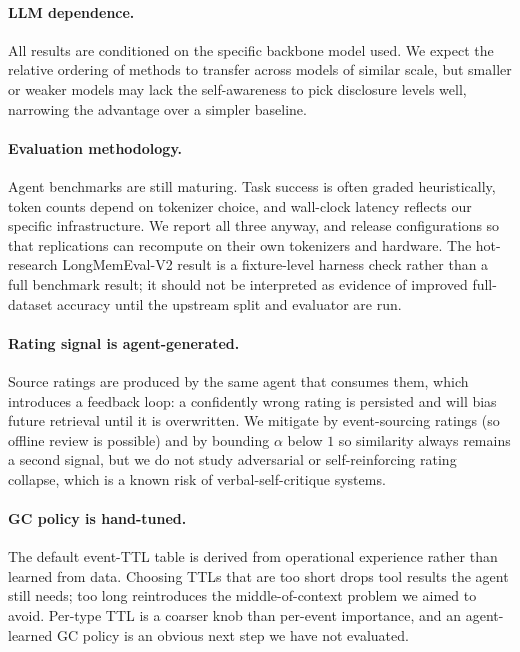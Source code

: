 \paragraph{LLM dependence.} All results are conditioned on the
specific backbone model used. We expect the relative ordering of
methods to transfer across models of similar scale, but smaller or
weaker models may lack the self-awareness to pick disclosure levels
well, narrowing the advantage over a simpler baseline.

\paragraph{Evaluation methodology.} Agent benchmarks are still
maturing. Task success is often graded heuristically, token counts
depend on tokenizer choice, and wall-clock latency reflects our
specific infrastructure. We report all three anyway, and release
configurations so that replications can recompute on their own
tokenizers and hardware. The hot-research LongMemEval-V2 result is a
fixture-level harness check rather than a full benchmark result; it
should not be interpreted as evidence of improved full-dataset
accuracy until the upstream split and evaluator are run.

\paragraph{Rating signal is agent-generated.} Source ratings are
produced by the same agent that consumes them, which introduces a
feedback loop: a confidently wrong rating is persisted and will bias
future retrieval until it is overwritten. We mitigate by event-sourcing
ratings (so offline review is possible) and by bounding $\alpha$ below
$1$ so similarity always remains a second signal, but we do not study
adversarial or self-reinforcing rating collapse, which is a known risk
of verbal-self-critique systems.

\paragraph{GC policy is hand-tuned.} The default event-TTL table is
derived from operational experience rather than learned from data.
Choosing TTLs that are too short drops tool results the agent still
needs; too long reintroduces the middle-of-context problem we aimed to
avoid. Per-type TTL is a coarser knob than per-event importance, and
an agent-learned GC policy is an obvious next step we have not
evaluated.

